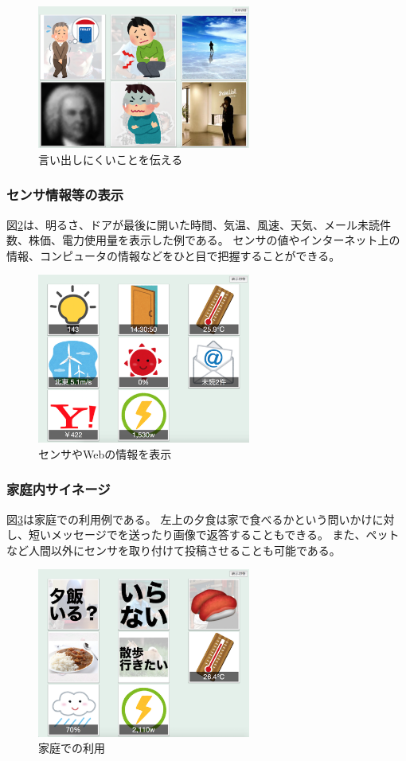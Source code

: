 \begin{figure}[h]
\centering
\includegraphics[width=7cm]{images/rescue.eps}
\caption{言い出しにくいことを伝える}
\label{rescue}
\end{figure}

\subsubsection{センサ情報等の表示}

図\ref{sensors}は、明るさ、ドアが最後に開いた時間、気温、風速、天気、メール未読件数、株価、電力使用量を表示した例である。
センサの値やインターネット上の情報、コンピュータの情報などをひと目で把握することができる。

\begin{figure}[h]
\centering
\includegraphics[width=7cm]{images/sensors.eps}
\caption{センサやWebの情報を表示}
\label{sensors}
\end{figure}

\subsubsection{家庭内サイネージ}

図\ref{home}は家庭での利用例である。
左上の夕食は家で食べるかという問いかけに対し、短いメッセージでを送ったり画像で返答することもできる。
また、ペットなど人間以外にセンサを取り付けて投稿させることも可能である。

\begin{figure}[h]
\centering
\includegraphics[width=7cm]{images/home.eps}
\caption{家庭での利用}
\label{home}
\end{figure}